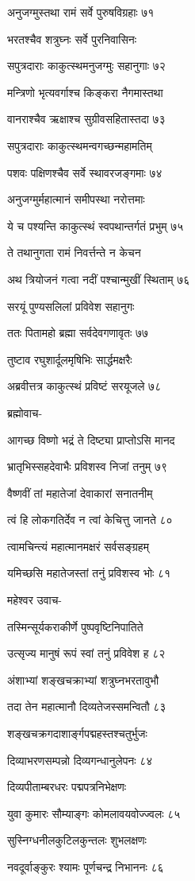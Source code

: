 अनुजग्मुस्तथा रामं सर्वे पुरुषविग्रहाः ७१

भरतश्चैव शत्रुघ्नः सर्वे पुरनिवासिनः

सपुत्रदाराः काकुत्स्थमनुजग्मुः सहानुगाः ७२

मन्त्रिणो भृत्यवर्गाश्च किङ्करा नैगमास्तथा

वानराश्चैव ऋक्षाश्च सुग्रीवसहितास्तदा ७३

सपुत्रदाराः काकुत्स्थमन्वगच्छन्महामतिम्

पशवः पक्षिणश्चैव सर्वे स्थावरजङ्गमाः ७४

अनुजग्मुर्महात्मानं समीपस्था नरोत्तमाः

ये च पश्यन्ति काकुत्स्थं स्वपथान्तर्गतं प्रभुम् ७५

ते तथानुगता रामं निवर्त्तन्ते न केचन

अथ त्रियोजनं गत्वा नदीं पश्चान्मुखीं स्थिताम् ७६

सरयूं पुण्यसलिलां प्रविवेश सहानुगः

ततः पितामहो ब्रह्मा सर्वदेवगणावृतः ७७

तुष्टाव रघुशार्दूलमृषिभिः सार्द्धमक्षरैः

अब्रवीत्तत्र काकुत्स्थं प्रविष्टं सरयूजले ७८

ब्रह्मोवाच-

आगच्छ विष्णो भद्रं ते दिष्ट्या प्राप्तोऽसि मानद

भ्रातृभिस्सहदेवाभैः प्रविशस्व निजां तनुम् ७९

वैष्णवीं तां महातेजां देवाकारां सनातनीम्

त्वं हि लोकगतिर्देव न त्वां केचित्तु जानते ८०

त्वामचिन्त्यं महात्मानमक्षरं सर्वसङ्ग्रहम्

यमिच्छसि महातेजस्तां तनुं प्रविशस्व भोः ८१

महेश्वर उवाच-

तस्मिन्सूर्यकराकीर्णे पुष्पवृष्टिनिपातिते

उत्सृज्य मानुषं रूपं स्वां तनुं प्रविवेश ह ८२

अंशाभ्यां शङ्खचक्राभ्यां शत्रुघ्नभरतावुभौ

तदा तेन महात्मानौ दिव्यतेजस्समन्वितौ ८३

शङ्खचक्रगदाशार्ङ्गपद्महस्तश्चतुर्भुजः

दिव्याभरणसम्पन्नो दिव्यगन्धानुलेपनः ८४

दिव्यपीताम्बरधरः पद्मपत्रनिभेक्षणः

युवा कुमारः सौम्याङ्गः कोमलावयवोज्ज्वलः ८५

सुस्निग्धनीलकुटिलकुन्तलः शुभलक्षणः

नवदूर्वाङ्कुरः श्यामः पूर्णचन्द्र निभाननः ८६

